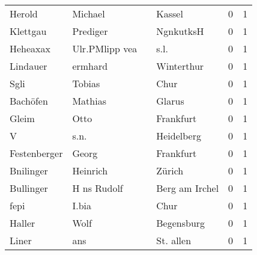 \begin{tabular}{llllrr}
                   Herold &                            Michael &             &                                      Kassel &          0 &         1 \\
                 Klettgau &                           Prediger &             &                                   NgnkutksH &          0 &         1 \\
                 Heheaxax &                     Ulr.PMlipp vea &             &                                        s.l. &          0 &         1 \\
                 Lindauer &                            ermhard &             &                                  Winterthur &          0 &         1 \\
                     Sgli &                             Tobias &             &                                        Chur &          0 &         1 \\
                 Bachöfen &                            Mathias &             &                                      Glarus &          0 &         1 \\
                    Gleim &                               Otto &             &                                   Frankfurt &          0 &         1 \\
                        V &                               s.n. &             &                                  Heidelberg &          0 &         1 \\
             Festenberger &                              Georg &             &                                   Frankfurt &          0 &         1 \\
                Bnilinger &                           Heinrich &             &                                      Zürich &          0 &         1 \\
                Bullinger &                        H ns Rudolf &             &                              Berg am Irchel &          0 &         1 \\
                     fepi &                              I.bia &             &                                        Chur &          0 &         1 \\
                   Haller &                               Wolf &             &                                  Begensburg &          0 &         1 \\
                    Liner &                                ans &             &                                   St. allen &          0 &         1 \\

\end{tabular}
